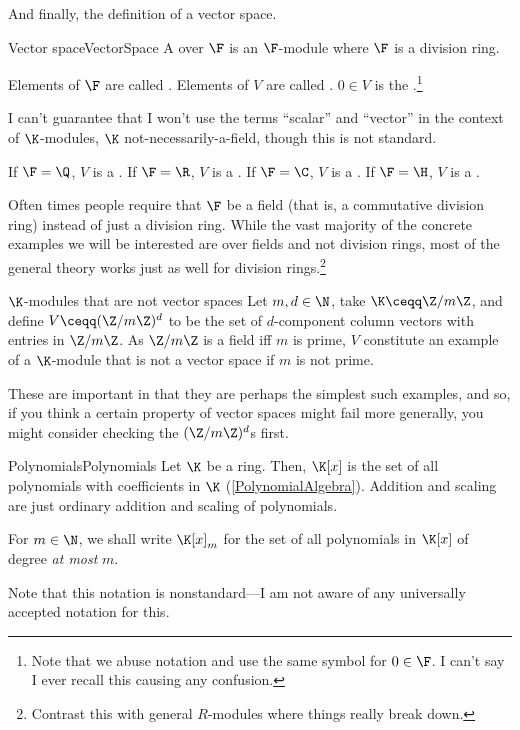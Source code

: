 And finally, the definition of a vector space.
\begin{dfn}{Vector space}{VectorSpace}
	A  over $\F$ is an $\F$-module where $\F$ is a division ring.
	\begin{rmk}
		Elements of $\F$ are called .  Elements of $V$ are called .  $0\in V$ is the .\footnote{Note that we abuse notation and use the same symbol for $0\in \F$.  I can't say I ever recall this causing any confusion.}
		
		I can't guarantee that I won't use the terms ``scalar'' and ``vector'' in the context of $\K$-modules, $\K$ not-necessarily-a-field, though this is not standard.
	\end{rmk}
	\begin{rmk}
		If $\F=\Q$, $V$ is a .  If $\F =\R$, $V$ is a .  If $\F =\C$, $V$ is a .  If $\F =\H$, $V$ is a \index{Quaternionic vector space}.
	\end{rmk}
	\begin{rmk}
		Often times people require that $\F$ be a field (that is, a commutative division ring) instead of just a division ring.  While the vast majority of the concrete examples we will be interested are over fields and not division rings, most of the general theory works just as well for division rings.\footnote{Contrast this with general $R$-modules where things really break down.}
	\end{rmk}
\end{dfn}
\begin{exm}{$\K$-modules that are not vector spaces}{}
	Let $m,d\in \N$, take $\K \ceqq \Z /m\Z$, and define $V\ceqq (\Z /m\Z )^d$ to be the set of $d$-component column vectors with entries in $\Z /m\Z$.  As $\Z /m\Z$ is a field iff $m$ is prime, $V$ constitute an example of a $\K$-module that is not a vector space if $m$ is not prime.
	
	These are important in that they are perhaps the simplest such examples, and so, if you think a certain property of vector spaces might fail more generally, you might consider checking the $(\Z /m\Z )^d$s first.
\end{exm}
\begin{exm}{Polynomials}{Polynomials}
	Let $\K$ be a ring.  Then, $\K [x]$ is the set of all polynomials with coefficients in $\K$ (\cref{PolynomialAlgebra}).  Addition and scaling are just ordinary addition and scaling of polynomials.
	
	For $m\in \N$, we shall write $\K [x]_m$ for the set of all polynomials in $\K [x]$ of degree \emph{at most} $m$.
	\begin{rmk}
		Note that this notation is nonstandard---I am not aware of any universally accepted notation for this.
	\end{rmk}
\end{exm}
